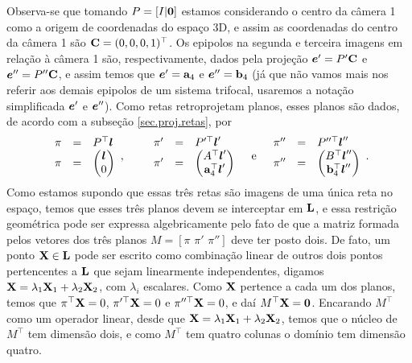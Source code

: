 Observa-se que tomando $P=[I|{\bf 0}]$ estamos considerando o centro da câmera 1 como a origem de coordenadas do espaço 3D, e assim as coordenadas do centro da câmera 1 são ${\bf C}=(0,0,0,1)^\top$. Os epipolos na segunda e terceira imagens em relação à câmera 1 são, respectivamente, dados pela projeção $\boldsymbol{e}'=P'{\bf C}$ e $\boldsymbol{e}''=P''{\bf C}$, e assim temos que $\boldsymbol{e}'={\bf a}_4$ e $\boldsymbol{e}''={\bf b}_4$ (já que não vamos mais nos referir aos demais epipolos de um sistema trifocal, usaremos a notação simplificada $\boldsymbol{e}'$ e $\boldsymbol{e}''$). Como retas retroprojetam planos, esses planos são dados, de acordo com a subseção \ref{sec.proj.retas}, por
\begin{equation*}
\begin{array}{rcl}
\pi&=&P^\top\boldsymbol{l}\\
\pi&=&
\begin{pmatrix}
\boldsymbol{l}\\
0
\end{pmatrix}
\end{array},\qquad
\begin{array}{rcl}
\pi'&=&P'^\top\boldsymbol{l}'\\
\pi'&=&
\begin{pmatrix}
A^\top\boldsymbol{l}'\\
{\bf a}^\top_4\boldsymbol{l}'
\end{pmatrix}
\end{array}\quad\text{e}\quad
\begin{array}{rcl}
\pi''&=&P''^\top\boldsymbol{l}''\\
\pi''&=&
\begin{pmatrix}
B^\top\boldsymbol{l}''\\
{\bf b}^\top_4\boldsymbol{l}''
\end{pmatrix}
\end{array}.
\end{equation*}
Como estamos supondo que essas três retas são imagens de uma única reta no espaço, temos que esses três planos devem se interceptar em ${\bf L}$, e essa restrição geométrica pode ser expressa algebricamente pelo fato de que a matriz formada pelos vetores dos três planos $M=[\pi \,\,\pi'\,\,\pi'']$ deve ter posto dois. De fato, um ponto $\mathbf{X}\in{\bf L}$ pode ser escrito como combinação linear de outros dois pontos pertencentes a ${\bf L}$ que sejam linearmente independentes, digamos $\mathbf{X}=\lambda_1\mathbf{X}_1+\lambda_2\mathbf{X}_2$, com $\lambda_i$ escalares. Como $\mathbf{X}$ pertence a cada um dos planos, temos que $\pi^\top\mathbf{X}=0$, $\pi'^\top\mathbf{X}=0$ e $\pi''^\top\mathbf{X}=0$, e daí $M^\top\mathbf{X}={\bf 0}$. Encarando $M^\top$ como um operador linear, desde que $\mathbf{X}=\lambda_1\mathbf{X}_1+\lambda_2\mathbf{X}_2$, temos que o núcleo de $M^\top$ tem dimensão dois, e como $M^\top$ tem quatro colunas o domínio tem dimensão quatro. 

